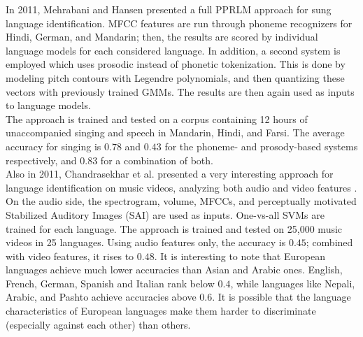 In 2011, Mehrabani and Hansen presented a full PPRLM approach for sung language identification. MFCC features are run through phoneme recognizers for Hindi, German, and Mandarin; then, the results are scored by individual language models for each considered language. In addition, a second system is employed which uses prosodic instead of phonetic tokenization. This is done by modeling pitch contours with Legendre polynomials, and then quantizing these vectors with previously trained GMMs. The results are then again used as inputs to language models.\\
The approach is trained and tested on a corpus containing 12 hours of unaccompanied singing and speech in Mandarin, Hindi, and Farsi. The average accuracy for singing is $0.78$ and $0.43$ for the phoneme- and prosody-based systems respectively, and $0.83$ for a combination of both.\\

Also in 2011, Chandrasekhar et al. presented a very interesting approach for language identification on music videos, analyzing both audio and video features \cite {chandrasekhar}. On the audio side, the spectrogram, volume, MFCCs, and perceptually motivated Stabilized Auditory Images (SAI) are used as inputs. One-vs-all SVMs are trained for each language. The approach is trained and tested on 25,000 music videos in 25 languages. Using audio features only, the accuracy is $0.45$; combined with video features, it rises to $0.48$. It is interesting to note that European languages achieve much lower accuracies than Asian and Arabic ones. English, French, German, Spanish and Italian rank below $0.4$, while languages like Nepali, Arabic, and Pashto achieve accuracies above $0.6$. It is possible that the language characteristics of European languages make them harder to discriminate (especially against each other) than others.

